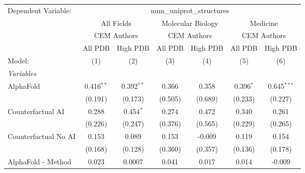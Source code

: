 \begingroup
\centering
\begin{tabular}{lcccccc}
   \tabularnewline \midrule \midrule
   Dependent Variable: & \multicolumn{6}{c}{num\_uniprot\_structures}\\
 & \multicolumn{2}{c}{All Fields} & \multicolumn{2}{c}{Molecular Biology} & \multicolumn{2}{c}{Medicine} \\
\cmidrule(lr){2-3} \cmidrule(lr){4-5} \cmidrule(lr){6-7}
 & \multicolumn{2}{c}{CEM Authors} & \multicolumn{2}{c}{CEM Authors} & \multicolumn{2}{c}{CEM Authors} \\
\cmidrule(lr){2-3} \cmidrule(lr){4-5} \cmidrule(lr){6-7}
 & \multicolumn{1}{c}{All PDB} & \multicolumn{1}{c}{High PDB} & \multicolumn{1}{c}{All PDB} & \multicolumn{1}{c}{High PDB} & \multicolumn{1}{c}{All PDB} & \multicolumn{1}{c}{High PDB} \\
\cmidrule(lr){2-2} \cmidrule(lr){3-3} \cmidrule(lr){4-4} \cmidrule(lr){5-5} \cmidrule(lr){6-6} \cmidrule(lr){7-7}
   Model:                                                     & (1)           & (2)           & (3)            & (4)           & (5)         & (6)\\  
   \midrule
   \emph{Variables}\\
   AlphaFold                                                  & 0.416$^{**}$  & 0.392$^{**}$  & 0.366          & 0.358         & 0.396$^{*}$ & 0.645$^{***}$\\   
                                                              & (0.191)       & (0.173)       & (0.505)        & (0.689)       & (0.233)     & (0.227)\\   
   Counterfactual AI                                          & 0.288         & 0.454$^{*}$   & 0.274          & 0.472         & 0.340       & 0.261\\   
                                                              & (0.226)       & (0.247)       & (0.376)        & (0.565)       & (0.229)     & (0.265)\\   
   Counterfactual No AI                                       & 0.153         & 0.089         & 0.153          & -0.009        & 0.119       & 0.154\\   
                                                              & (0.168)       & (0.128)       & (0.360)        & (0.357)       & (0.136)     & (0.178)\\   
   AlphaFold - Method                                         & 0.023         & 0.0007        & 0.041          & 0.017         & 0.014       & -0.009\\   

\end{tabular}
